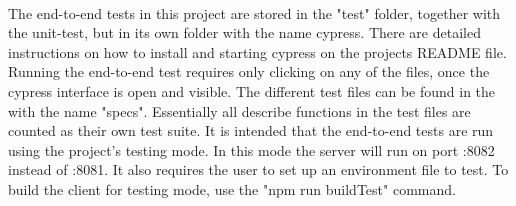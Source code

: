 \\[11pt]
The end-to-end tests in this project are stored in the "test" folder, together with the unit-test, but in its own folder with the name cypress. There are detailed instructions on how to install and starting cypress on the projects README file. Running the end-to-end test requires only clicking on any of the files, once the cypress interface is open and visible. The different test files can be found in the with the name "specs". Essentially all describe functions in the test files are counted as their own test suite. It is intended that the end-to-end tests are run using the project's testing mode. In this mode the server will run on port :8082 instead of :8081. It also requires the user to set up an environment file to test. To build the client for testing mode, use the "npm run buildTest" command.
